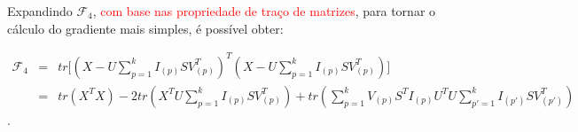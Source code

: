 \documentclass[
    12pt,                %
    oneside,            %
    a4paper,            %
    english,            %
    brazil                %
    ]{abntex2ppgsi}
\begin{document}
Expandindo $\mathcal{F}_4$, \textcolor{red}{com base nas propriedade de traço de matrizes}, para tornar o cálculo do gradiente mais simples, é possível obter: %


\[
    \begin{array}{lcl}
        \displaystyle \mathcal{F}_4 & = & tr\big[ (X - U\sum_{p=1}^{k}I_{(p)}SV_{(p)}^T)^T (X - U\sum_{p=1}^{k}I_{(p)}SV_{(p)}^T) \big] \\
                                    & = & tr(X^TX) - 2 tr( X^T U \sum_{p=1}^{k} I_{(p)} S V_{(p)}^T ) + tr( \sum_{p=1}^{k} V_{(p)} S^T I_{(p)} U^T U \sum_{p'=1}^k I_{(p')} S V_{(p')}^T )
    \end{array}
\].






\end{document}
